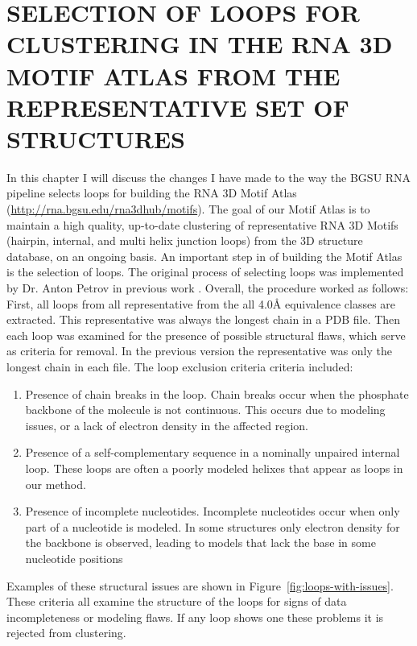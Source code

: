 \chapter{SELECTION OF LOOPS FOR CLUSTERING IN THE RNA 3D MOTIF ATLAS FROM THE
REPRESENTATIVE SET OF STRUCTURES}

In this chapter I will discuss the changes I have made to the way the BGSU RNA
pipeline selects loops for building the RNA 3D Motif Atlas
(\url{http://rna.bgsu.edu/rna3dhub/motifs}). The goal of our Motif Atlas is to
maintain a high quality, up-to-date clustering of representative RNA 3D Motifs
(hairpin, internal, and multi helix junction loops) from the 3D structure
database, on an ongoing basis. An important step in of building the Motif Atlas
is the selection of loops. The original process of selecting loops was
implemented by Dr. Anton Petrov in previous work \cite{Petrov2012}. Overall, the
procedure worked as follows: First, all loops from all representative from the
all 4.0{\AA} equivalence classes are extracted. This representative was always
the longest chain in a PDB file. Then each loop was examined for the presence of
possible structural flaws, which serve as criteria for removal. In the previous
version the representative was only the longest chain in each file. The loop
exclusion criteria criteria included:

\begin{enumerate}
  \item Presence of chain breaks in the loop. Chain breaks occur when the
    phosphate backbone of the molecule is not continuous. This occurs due to
    modeling issues, or a lack of electron density in the affected region.

  \item Presence of a self-complementary sequence in a nominally unpaired
    internal loop. These loops are often a poorly modeled helixes that appear as
    loops in our method.

  \item Presence of incomplete nucleotides. Incomplete nucleotides occur when
    only part of a nucleotide is modeled. In some structures only electron
    density for the backbone is observed, leading to models that lack the base
    in some nucleotide positions
\end{enumerate}

Examples of these structural issues are shown in
Figure~\ref{fig:loops-with-issues}. These criteria all examine the structure of
the loops for signs of data incompleteness or modeling flaws. If any loop shows
one these problems it is rejected from clustering.


